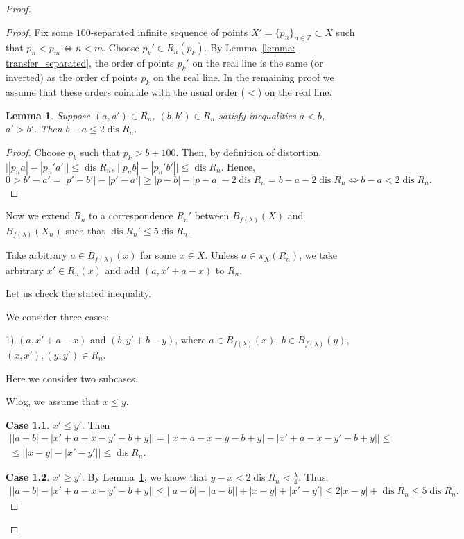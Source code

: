 \documentclass[10pt,a4paper]{amsart}
\newtheorem{lemma}{Lemma}
\newcommand{\Z}{\mathbb{Z}}
\newcommand{\dis}{\operatorname{dis}}
\renewcommand{\ss}{\subset}
\begin{document}
\begin{proof}
\begin{proof}
Fix some $100$-separated infinite sequence of points $X' = \{p_n\}_{n\in\Z}\ss X$ such that $p_n < p_m \Longleftrightarrow n < m$. Choose $p_k'\in R_n(p_k)$. By Lemma~\ref{lemma: transfer_separated}, the order of points $p_k'$ on the real line is the same (or inverted) as the order of points $p_k$ on the real line. In the remaining proof we assume that these orders coincide with the usual order ($<$) on the real line.

\begin{lemma}\label{lemma: order_change} Suppose $(a, a')\in R_n$, $(b, b')\in R_n$ satisfy inequalities $a < b$, $a' > b'$. Then $b-a \le 2\dis R_n$. 
\end{lemma}

\begin{proof}
Choose $p_k$ such that $p_k > b+100$. Then, by definition of distortion, $\big||p_na|-|p_n'a'|\big|\le \dis R_n$, $\big||p_nb|-|p_n'b'|\big|\le \dis R_n$. Hence, $$0 > b' - a' = |p'-b'| - |p'-a'|\ge |p - b| - |p-a| - 2\dis R_n = b-a - 2\dis R_n \Longleftrightarrow b-a < 2\dis R_n.$$
\end{proof}

Now we extend $R_n$ to a correspondence $R_n'$ between $B_{f(\lambda)}(X)$ and $B_{f(\lambda)}(X_n)$ such that $\dis R_n'\le 5\dis R_n$. 

Take arbitrary $a\in B_{f(\lambda)}(x)$ for some $x\in X$. Unless $a\in\pi_X(R_n)$, we take arbitrary $x'\in R_n(x)$ and add $(a, x' + a - x)$ to $R_n$. 

Let us check the stated inequality. 

We consider three cases:

1) $(a, x' + a-x)$ and $(b, y'+b -y)$, where $a\in B_{f(\lambda)}(x)$, $b\in B_{f(\lambda)}(y)$, $(x, x'), (y, y')\in R_n$.

Here we consider two subcases. 

Wlog, we assume that $x \le y$. 

\textbf{Case 1.1}. $x' \le y'$. Then 
\begin{multline*}
\big||a-b| - |x'+a-x - y'-b + y|\big| = \big||x + a-x - y - b + y| - |x'+a-x - y'-b + y|\big| \le\\\le \big||x-y| - |x'-y'|\big|\le \dis R_n.
\end{multline*}

\textbf{Case 1.2}. $x' \ge y'$. By Lemma~\ref{lemma: order_change}, we know that $y-x<2\dis R_n < \frac{\lambda}{4}$. Thus,
\begin{align*}
\big||a-b| - |x'+a-x - y'-b + y|\big| \le \big||a-b| - |a-b|\big| + |x-y|+|x'-y'|\le 2|x-y| + \dis R_n\le  5\dis R_n.
\end{align*}



\end{proof}
\end{proof}
\end{document}

